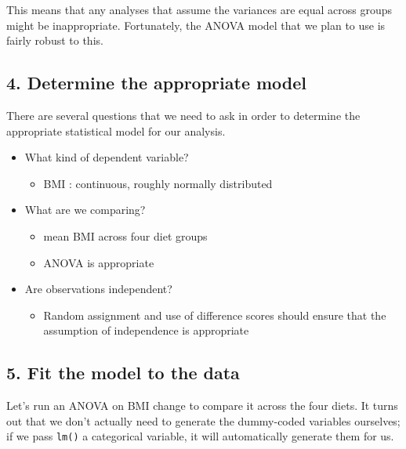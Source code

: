 \documentclass[12pt,]{book}
\providecommand{\tightlist}{%
  \setlength{\itemsep}{0pt}\setlength{\parskip}{0pt}}
\theoremstyle{definition}
\theoremstyle{definition}
\theoremstyle{definition}
\theoremstyle{remark}
\begin{document}
This means that any analyses that assume the variances are equal across groups might be inappropriate. Fortunately, the ANOVA model that we plan to use is fairly robust to this.

\hypertarget{determine-the-appropriate-model}{%
\subsection{4. Determine the appropriate model}\label{determine-the-appropriate-model}}

There are several questions that we need to ask in order to determine the appropriate statistical model for our analysis.

\begin{itemize}
\tightlist
\item
  What kind of dependent variable?

  \begin{itemize}
  \tightlist
  \item
    BMI : continuous, roughly normally distributed
  \end{itemize}
\item
  What are we comparing?

  \begin{itemize}
  \tightlist
  \item
    mean BMI across four diet groups
  \item
    ANOVA is appropriate
  \end{itemize}
\item
  Are observations independent?

  \begin{itemize}
  \tightlist
  \item
    Random assignment and use of difference scores should ensure that the assumption of independence is appropriate
  \end{itemize}
\end{itemize}

\hypertarget{fit-the-model-to-the-data}{%
\subsection{5. Fit the model to the data}\label{fit-the-model-to-the-data}}

Let's run an ANOVA on BMI change to compare it across the four diets. It turns out that we don't actually need to generate the dummy-coded variables ourselves; if we pass \texttt{lm()} a categorical variable, it will automatically generate them for us.
\end{document}
